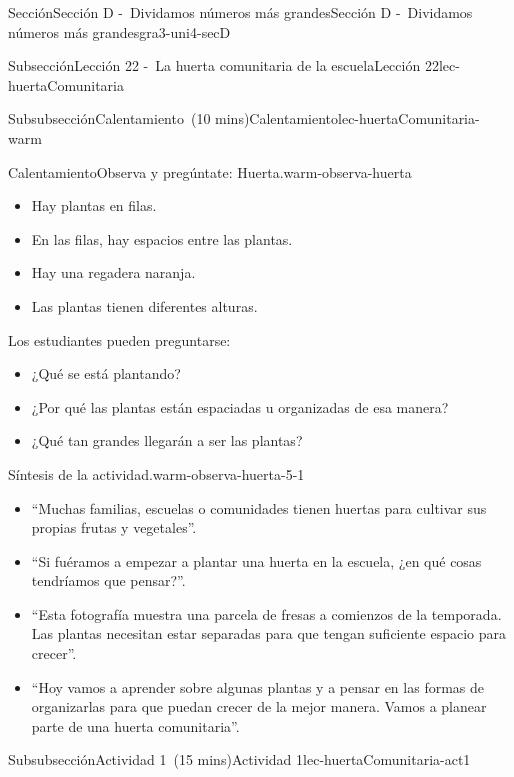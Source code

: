 \documentclass[oneside,10pt,]{article}
\begin{document}
\begin{sectionptx}{Sección}{Sección D -~Dividamos números más grandes}{}{Sección D -~Dividamos números más grandes}{}{}{gra3-uni4-secD}
\begin{subsectionptx}{Subsección}{Lección 22 -~La huerta comunitaria de la escuela}{}{Lección 22}{}{}{lec-huertaComunitaria}
\begin{subsubsectionptx}{Subsubsección}{Calentamiento~(10 mins)}{}{Calentamiento}{}{}{lec-huertaComunitaria-warm}
\begin{exploration}{Calentamiento}{Observa y pregúntate: Huerta.}{warm-observa-huerta}
%
\begin{itemize}[label=\textbullet]
\item{}Hay plantas en filas.%
\item{}En las filas, hay espacios entre las plantas.%
\item{}Hay una regadera naranja.%
\item{}Las plantas tienen diferentes alturas.%
\end{itemize}
Los estudiantes pueden preguntarse:%
%
\begin{itemize}[label=\textbullet]
\item{}¿Qué se está plantando?%
\item{}¿Por qué las plantas están espaciadas u organizadas de esa manera?%
\item{}¿Qué tan grandes llegarán a ser las plantas?%
\end{itemize}
\end{exploration}%
%
\par
\begin{paragraphs}{Síntesis de la actividad.}{warm-observa-huerta-5-1}%
%
\begin{itemize}[label=\textbullet]
\item{}``Muchas familias, escuelas o comunidades tienen huertas para cultivar sus propias frutas y vegetales''.%
\item{}``Si fuéramos a empezar a plantar una huerta en la escuela, ¿en qué cosas tendríamos que pensar?''.%
\item{}``Esta fotografía muestra una parcela de fresas a comienzos de la temporada. Las plantas necesitan estar separadas para que tengan suficiente espacio para crecer''.%
\item{}``Hoy vamos a aprender sobre algunas plantas y a pensar en las formas de organizarlas para que puedan crecer de la mejor manera. Vamos a planear parte de una huerta comunitaria''.%
\end{itemize}
\end{paragraphs}%
\end{subsubsectionptx}
%
%
\typeout{************************************************}
\typeout{************************************************}
%
\begin{subsubsectionptx}{Subsubsección}{Actividad 1~(15 mins)}{}{Actividad 1}{}{}{lec-huertaComunitaria-act1}
\par

\end{subsubsectionptx}
\end{subsectionptx}
\end{sectionptx}
\end{document}
